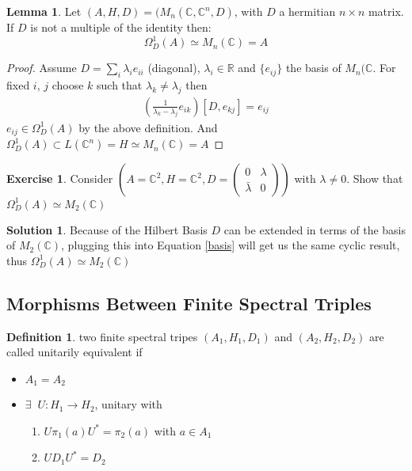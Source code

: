 \documentclass[a4paper]{article}
\theoremstyle{definition}
\newtheorem{definition}{Definition}
\theoremstyle{definition}
\theoremstyle{definition}
\theoremstyle{theorem}
\theoremstyle{theorem}
\newtheorem{lemma}{Lemma}
\theoremstyle{theorem}
\newtheorem{exercise}{Exercise}
\theoremstyle{definition}
\newtheorem{solution}{Solution}
\begin{document}
\begin{lemma}
    Let $(A, H, D) = (M_n(\mathbb{C}, \mathbb{C}^n, D)$, with $D$ a hermitian
    $n\times n$ matrix. If $D$ is not a multiple of the identity then:
    \begin{equation}
        \Omega _D ^1 (A)  \simeq  M_n(\mathbb{C}) = A
    \end{equation}
\end{lemma}

\begin{proof}
    Assume $D = \sum _i \lambda _i e_{ii}$ (diagonal), $\lambda _i \in \mathbb{R}$ and
    $\{e_{ij}\}$ the basis of $M_n(\mathbb{C}$. For fixed $i$, $j$ choose $k$
    such that $\lambda _k \neq \lambda _j$ then
    \begin{align} \label{basis}
        \left(\frac{1}{\lambda _k - \lambda _j} e_{ik}\right) [D, e_{kj}] =
        e_{ij}
    \end{align}
    $e_{ij}\in \Omega _D ^1 (A)$ by the above definition. And $\Omega _D ^1
    (A) \subset L(\mathbb{C}^n) = H \simeq M_n(\mathbb{C}) = A$
\end{proof}

\begin{exercise}
     Consider $(A=\mathbb{C}^2, H=\mathbb{C}^2,
     D = \begin{pmatrix} 0 & \lambda \\ \bar{\lambda} & 0
     \end{pmatrix})$ with $\lambda \neq 0$. Show that $\Omega _D^1(A)
     \simeq M_2(\mathbb{C})$
\end{exercise}
\begin{solution}
    Because of the Hilbert Basis $D$ can be extended in terms of
    the basis of $M_2(\mathbb{C})$, plugging this into Equation
    \ref{basis} will get us the same cyclic result, thus
    $\Omega _D^1(A) \simeq M_2(\mathbb{C})$
\
\end{solution}

\subsection{Morphisms Between Finite Spectral Triples}
\begin{definition}
    two finite spectral tripes $(A_1, H_1, D_1)$ and $(A_2, H_2, D_2)$ are
    called unitarily equivalent if
    \begin{itemize}
        \item $A_1 = A_2$
        \item $\exists \;\; U: H_1 \rightarrow H_2$, unitary with
            \begin{enumerate}
                \item  $U\pi_1(a)U^* = \pi_2(a)$ with $a \in A_1$
                \item  $UD_1 U^* = D_2$
            \end{enumerate}
    \end{itemize}
\end{definition}
\end{document}
